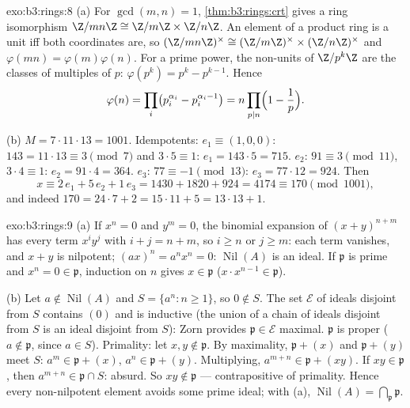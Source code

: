 \begin{solution}{exo:b3:rings:8}
(a) For $\gcd(m, n) = 1$, \cref{thm:b3:rings:crt} gives a ring
isomorphism $\Z/mn\Z \cong \Z/m\Z \times \Z/n\Z$. An element of a
product ring is a unit iff both coordinates are, so
$(\Z/mn\Z)^\times \cong (\Z/m\Z)^\times \times (\Z/n\Z)^\times$
and $\varphi(mn) = \varphi(m)\varphi(n)$. For a prime power, the
non-units of $\Z/p^k\Z$ are the classes of multiples of $p$:
$\varphi(p^k) = p^k - p^{k-1}$. Hence
\[
\varphi(n) = \prod_i \bigl(p_i^{\alpha_i} -
p_i^{\alpha_i-1}\bigr) = n \prod_{p \mid n}\Bigl(1 -
\frac1p\Bigr).
\]

(b) $M = 7 \cdot 11 \cdot 13 = 1001$. Idempotents: $e_1 \equiv
(1, 0, 0)$: $143 = 11\cdot13 \equiv 3 \pmod 7$ and $3 \cdot 5
\equiv 1$: $e_1 = 143 \cdot 5 = 715$. $e_2$: $91 \equiv 3
\pmod{11}$, $3 \cdot 4 \equiv 1$: $e_2 = 91\cdot4 = 364$. $e_3$:
$77 \equiv -1 \pmod{13}$: $e_3 = 77 \cdot 12 = 924$. Then
\[
x \equiv 2\,e_1 + 5\,e_2 + 1\,e_3 = 1430 + 1820 + 924 = 4174
\equiv 170 \pmod{1001},
\]
and indeed $170 = 24\cdot7 + 2 = 15\cdot11 + 5 = 13\cdot13 + 1$.
\end{solution}

\begin{solution}{exo:b3:rings:9}
(a) If $x^n = 0$ and $y^m = 0$, the binomial expansion of
$(x+y)^{n+m}$ has every term $x^iy^j$ with $i + j = n + m$, so $i
\geq n$ or $j \geq m$: each term vanishes, and $x + y$ is
nilpotent; $(ax)^n = a^nx^n = 0$: $\operatorname{Nil}(A)$ is an
ideal. If $\mathfrak p$ is prime and $x^n = 0 \in \mathfrak p$,
induction on $n$ gives $x \in \mathfrak p$ ($x \cdot x^{n-1} \in
\mathfrak p$).

(b) Let $a \notin \operatorname{Nil}(A)$ and $S = \{a^n : n \geq
1\}$, so $0 \notin S$. The set $\mathcal E$ of ideals disjoint
from $S$ contains $(0)$ and is inductive (the union of a chain of
ideals disjoint from $S$ is an ideal disjoint from $S$): Zorn
provides $\mathfrak p \in \mathcal E$ maximal. $\mathfrak p$ is
proper ($a \notin \mathfrak p$, since $a \in S$). Primality: let
$x, y \notin \mathfrak p$. By maximality, $\mathfrak p + (x)$ and
$\mathfrak p + (y)$ meet $S$: $a^m \in \mathfrak p + (x)$, $a^n
\in \mathfrak p + (y)$. Multiplying, $a^{m+n} \in \mathfrak p +
(xy)$. If $xy \in \mathfrak p$, then $a^{m+n} \in \mathfrak p \cap
S$: absurd. So $xy \notin \mathfrak p$ --- contrapositive of
primality. Hence every non-nilpotent element avoids some prime
ideal; with (a),
$\operatorname{Nil}(A) = \bigcap_{\mathfrak p} \mathfrak p$.
\end{solution}

